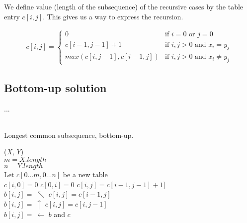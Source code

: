 We define value (length of the subsequence) of the recursive cases by the
table entry $c[i,j]$. This gives us a way to express the recursion.

\begin{align}
	c[i,j] =
	\begin{cases}
		0 & \mbox{if $i = 0$ or $j = 0$} \\
		c[i - 1, j - 1] + 1 & \mbox{if $i, j > 0$ and $x_i = y_j$} \\
		max(c[i, j-1], c[i-1, j]) & \mbox{if $i, j > 0$ and $x_i \neq y_j$}
	\end{cases}
\end{align}

\newpage
\subsection{Bottom-up solution}
...
\\\\
\begin{algorithm}[H]
	\caption{Longest common subsequence, bottom-up.}
	\label{alg:lcs-bottom-up}
	
	
	
	
	\BlankLine
	\LCS($X$, $Y$) \\
	\Begin
	{
		$m = X.length$ \\
		$n = Y.length$ \\
		Let $c[0 \dots m, 0 \dots n]$ be a new table \\
		{
			$c[i, 0] = 0$
		}
		{
			$c[0, i] = 0$
		}
		{
			{
				{
					$c[i, j] = c[i-1,j-1] + 1]$ \\
					$b[i, j] ={\ }\nwarrow$
				}
				{
					$c[i, j] = c[i-1, j]$ \\
					$b[i, j] ={\ }\uparrow$
				}
				\Else
				{
					$c[i, j] = c[i, j-1]$ \\
					$b[i, j] ={\ }\leftarrow$
				}
			}
		}
		\Return $b$ and $c$
	}
\end{algorithm}


